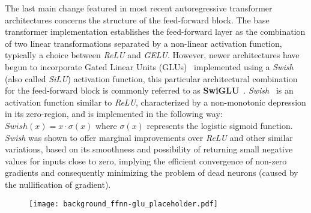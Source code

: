 The last main change featured in most recent autoregressive transformer architectures concerns the structure of the feed-forward block.
The base transformer implementation establishes the feed-forward layer as the combination of two linear transformations separated by a non-linear activation function, typically a choice between \emph{ReLU} and \emph{GELU}.
However, newer architectures have begun to incorporate Gated Linear Units (GLUs)~\cite{dauphin2017} implemented using a \emph{Swish} (also called \emph{SiLU}) activation function, this particular architectural combination for the feed-forward block is commonly referred to as \textbf{SwiGLU}~\cite{shazeer2020}.
\emph{Swish}~\cite{shazeer2020} is an activation function similar to \emph{ReLU}, characterized by a non-monotonic depression in its zero-region, and is implemented in the following way: $Swish(x) = x \cdot \sigma(x)$ where $\sigma(x)$ represents the logistic sigmoid function.
\emph{Swish} was shown to offer marginal improvements over \emph{ReLU} and other similar variations, based on its smoothness and possibility of returning small negative values for inputs close to zero, implying the efficient convergence of non-zero gradients and consequently minimizing the problem of dead neurons (caused by the nullification of gradient).

\begin{figure}[H]
    \centering
    \texttt{[image: background\_ffnn-glu\_placeholder.pdf]}
    \caption{}
    \label{fig:background_ffnn-glu}
\end{figure}

